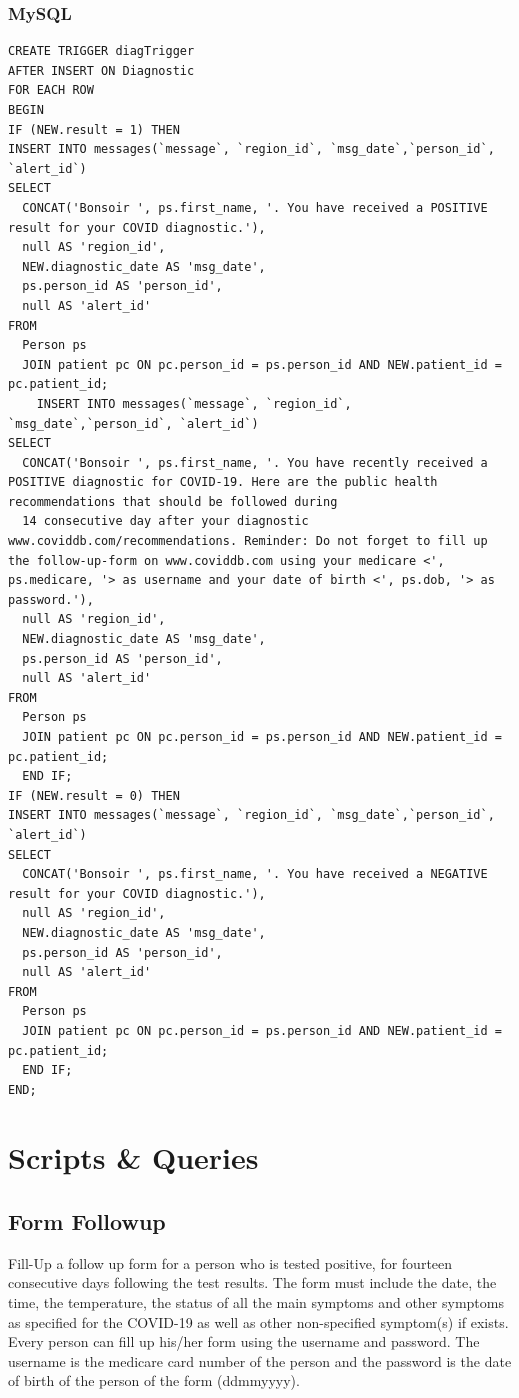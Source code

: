 \subsubsection{MySQL}
\begin{verbatim}
CREATE TRIGGER diagTrigger
AFTER INSERT ON Diagnostic
FOR EACH ROW
BEGIN
IF (NEW.result = 1) THEN
INSERT INTO messages(`message`, `region_id`, `msg_date`,`person_id`, `alert_id`)
SELECT 
  CONCAT('Bonsoir ', ps.first_name, '. You have received a POSITIVE result for your COVID diagnostic.'),
  null AS 'region_id',
  NEW.diagnostic_date AS 'msg_date',
  ps.person_id AS 'person_id',
  null AS 'alert_id'
FROM 
  Person ps
  JOIN patient pc ON pc.person_id = ps.person_id AND NEW.patient_id = pc.patient_id;
    INSERT INTO messages(`message`, `region_id`, `msg_date`,`person_id`, `alert_id`)
SELECT 
  CONCAT('Bonsoir ', ps.first_name, '. You have recently received a POSITIVE diagnostic for COVID-19. Here are the public health recommendations that should be followed during 
  14 consecutive day after your diagnostic www.coviddb.com/recommendations. Reminder: Do not forget to fill up the follow-up-form on www.coviddb.com using your medicare <', ps.medicare, '> as username and your date of birth <', ps.dob, '> as password.'),
  null AS 'region_id',
  NEW.diagnostic_date AS 'msg_date',
  ps.person_id AS 'person_id',
  null AS 'alert_id'
FROM 
  Person ps
  JOIN patient pc ON pc.person_id = ps.person_id AND NEW.patient_id = pc.patient_id;
  END IF;
IF (NEW.result = 0) THEN
INSERT INTO messages(`message`, `region_id`, `msg_date`,`person_id`, `alert_id`)
SELECT 
  CONCAT('Bonsoir ', ps.first_name, '. You have received a NEGATIVE result for your COVID diagnostic.'),
  null AS 'region_id',
  NEW.diagnostic_date AS 'msg_date',
  ps.person_id AS 'person_id',
  null AS 'alert_id'
FROM 
  Person ps
  JOIN patient pc ON pc.person_id = ps.person_id AND NEW.patient_id = pc.patient_id;
  END IF;
END;
\end{verbatim}



\section{Scripts \& Queries}

\subsection{Form Followup}
Fill-Up a follow up form for a person who is tested positive, for fourteen consecutive days following the test results. The form must include the date, the time, the temperature, the status of all the main symptoms and other symptoms as specified for the COVID-19 as well as other non-specified symptom(s) if exists. Every person can fill up his/her form using the username and password. The username is the medicare card number of the person and the password is the date of birth of the person of the form (ddmmyyyy).
